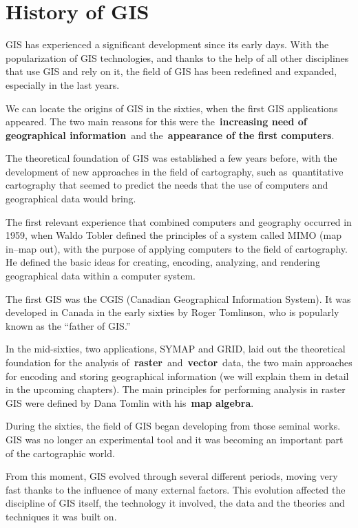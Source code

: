 
\chapter{History of GIS}


\pagestyle{fancy}

GIS has experienced a significant development since its early days. With the popularization of GIS technologies, and thanks to the help of all other disciplines that use GIS and rely on it, the field of GIS has been redefined and expanded, especially in the last years.

We can locate the origins of GIS in the sixties, when the first GIS applications appeared. The two main reasons for this were the \textbf{increasing need of geographical information} and the \textbf{appearance of the first computers}.

The theoretical foundation of GIS was established a few years before, with the development of new approaches in the field of cartography, such as quantitative cartography that seemed to predict the needs that the use of computers and geographical data would bring.

The first relevant experience that combined computers and geography occurred in 1959, when Waldo Tobler defined the principles of a system called MIMO (map in--map out), with the purpose of applying computers to the field of cartography. He defined the basic ideas for creating, encoding, analyzing, and rendering geographical data within a computer system.

The first GIS was the CGIS (Canadian Geographical Information System). It was developed in Canada in the early sixties by Roger Tomlinson, who is popularly known as the ``father of GIS.''

In the mid-sixties, two applications, SYMAP and GRID, laid out the theoretical foundation for the analysis of \textbf{raster} and \textbf{vector} data, the two main approaches for encoding and storing geographical information (we will explain them in detail in the upcoming chapters). The main principles for performing analysis in raster GIS were defined by Dana Tomlin with his \textbf{map algebra}.

During the sixties, the field of GIS began developing from those seminal works. GIS was no longer an experimental tool and it was becoming an important part of the cartographic world.

From this moment, GIS evolved through several different periods, moving very fast thanks to the influence of many external factors. This evolution affected the discipline of GIS itself, the technology it involved, the data and the theories and techniques it was built on.

